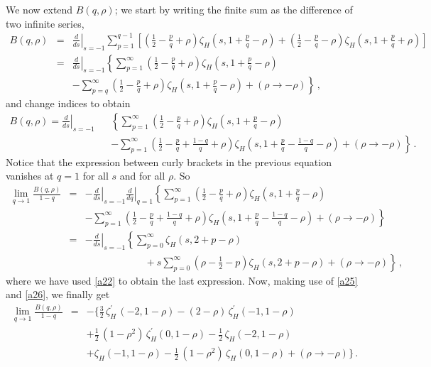 \documentclass[12pt,a4paper]{article}
\newcommand{\beq}{\begin{eqnarray}}
\newcommand{\eeq}{\end{eqnarray}}
\newcommand{\nn}{\nonumber}
\numberwithin{equation}{section}
\begin{document}
We now extend $B(q,\rho)$; we start by writing the finite sum as the difference of two infinite series,
\beq
B(q,\rho)&=&\left.\frac{d}{ds}\right\vert_{s=-1} \sum_{p=1}^{q-1}\left[\left(\frac12 -\frac{p}{q}+\rho \right)\zeta_H (s, 1+\frac{p}{q}-\rho) +
\left(\frac12 -\frac{p}{q}-\rho \right)\zeta_H (s, 1+\frac{p}{q}+\rho)\right]\nn\\
&=& \left.\frac{d}{ds}\right\vert_{s=-1}\left\{ \sum_{p=1}^{\infty}\left(\frac12 -\frac{p}{q}+\rho \right)\zeta_H (s, 1+\frac{p}{q}-\rho)
\right.\nn\\
&& - \left.\sum_{p=q}^{\infty}\left(\frac12 -\frac{p}{q}+\rho \right)\zeta_H (s, 1+\frac{p}{q}-\rho) + (\rho \rightarrow -\rho) \right\}\,,\nn
\eeq
and change indices to obtain
\beq
B(q,\rho)=  \left.\frac{d}{ds}\right\vert_{s=-1} && \left\{ \sum_{p=1}^{\infty}\left(\frac12 -\frac{p}{q}+\rho \right)\zeta_H (s, 1+\frac{p}{q}-\rho)
\right.\nn\\
&& - \left.\sum_{p=1}^{\infty}\left(\frac12 -\frac{p}{q}+\frac{1-q}{q}+\rho \right)\zeta_H (s, 1+\frac{p}{q}-\frac{1-q}{q}-\rho) + (\rho \rightarrow -\rho) \right\}\,.\nn
\eeq
Notice that the expression between curly brackets in the previous equation vanishes at $q=1$ for all $s$ and for all $\rho$. So
\beq
\lim_{q\rightarrow 1} \frac{B(q,\rho)}{1-q} &=& -\left.\frac{d}{ds}\right\vert_{s=-1} \left.\frac{d}{dq}\right\vert_{q=1}\left\{\sum_{p=1}^{\infty}
\left(\frac12 -\frac{p}{q}+\rho \right)\zeta_H (s, 1+\frac{p}{q}-\rho)\right.\nn\\
&& - \left.\sum_{p=1}^{\infty}\left(\frac12 -\frac{p}{q}+\frac{1-q}{q}+\rho \right)\zeta_H (s, 1+\frac{p}{q}-\frac{1-q}{q}-\rho) + (\rho \rightarrow -\rho) \right\}\nn\\
&=& -\left.\frac{d}{ds}\right\vert_{s=-1}\left\{\sum_{p=0}^{\infty}\zeta_H (s, 2+p-\rho)\right.\nn\\
&&\qquad\qquad\qquad+ \left.s \sum_{p=0}^{\infty}\left(\rho-\frac12 -p\right)\zeta_H (s, 2+p-\rho)+ (\rho \rightarrow -\rho)\right\}\,,\nn
\eeq
where we have used \eqref{a22} to obtain the last expression. Now, making use of \eqref{a25} and \eqref{a26}, we finally get
\beq
\lim_{q\rightarrow 1} \frac{B(q,\rho)}{1-q} &=&-\Bigg\{ \frac32\,\zeta_H^{\prime}\, (-2, 1-\rho)- (2-\rho)\,\zeta_H^{\prime} (-1, 1-\rho)\nn\\
&& +\frac12\,(1-\rho^2)\,\zeta_H^{\prime} (0, 1-\rho)-\frac12\,\zeta_H(-2, 1-\rho)\nn\\
&& +\zeta_H(-1, 1-\rho)-\frac12\,(1-\rho^2)\,\zeta_H (0, 1-\rho)+(\rho \rightarrow -\rho)\Bigg\}\,.
\label{besc}
\eeq
\end{document}
